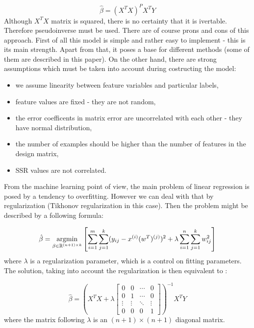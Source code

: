 \begin{equation}\label{eq:LR3}
    \hat{\beta} = (X^TX)^{P}X^TY
\end{equation}
Although $X^TX$ matrix is squared, there is no certainty that it is ivertable. Therefore pseudoinverse must be used. There are of course prons and cons of this approach. First of all this model is simple and rather easy to implement - this is its main strength. Apart from that, it poses a base for different methods (some of them are described in this paper). On the other hand, there are strong assumptions which must be taken into account during costructing the model:
\begin{itemize}
    \item we assume linearity between feature variables and particular labels,
    \item feature values are fixed - they are not random,
    \item the error coefficents in matrix error are uncorrelated with each other - they have normal distribution,
    \item the number of examples should be higher than the number of features in the design matrix,
    \item SSR values are not correlated.
\end{itemize}

From the machine learning point of view, the main problem of linear regression is posed by a tendency to overfitting. However we can deal with that by regularization (Tikhonov regularization in this case). Then the problem might be described by a following formula:

\begin{equation}\label{eq:LR2}
    \hat{\beta} = \operatorname*{argmin}_{\beta \in \mathbb{R}^{(n+1) \times k}}\left[\sum\limits_{i=1}^{m}\sum\limits_{j=1}^{k}(y_{ij}-x^{(i)}(w^T)^{(j)})^2 + \lambda\sum\limits_{i=1}^{n}\sum\limits_{j=1}^{k}w_{ij}^2\right]
\end{equation}
where $\lambda$ is a regularization parameter, which is a control on fitting parameters.
The solution, taking into account the regularization is then equivalent to \cite{Tikh}:

\begin{equation}\label{eq:LR3}
    \hat{\beta} = (X^TX+\lambda
        \begin{bmatrix}
        0 & 0 & \cdots & 0 \\
        0 & 1 & \cdots & 0 \\
        \vdots & \vdots & \ddots & \vdots \\
        0 & 0 & 0 & 1
        \end{bmatrix}
    )^{-1}X^TY
\end{equation}
where the matrix following $\lambda$ is an $(n+1)\times(n+1)$ diagonal matrix.  


